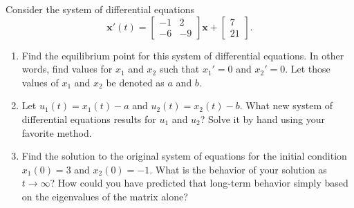 \documentclass[12pt,letterpaper]{hmcpset}
\newcommand{\m}[1]{\begin{bmatrix} #1 \end{bmatrix}}
\begin{document}
\begin{problem}[4]
    Consider the system of differential equations
    \[
        \mathbf{x}'(t)=\m{-1&2\\-6&-9}\mathbf{x}+\m{7\\21}.
    \]
    \begin{enumerate}
        \item Find the equilibrium point for this system of
            differential equations.  In other words, find values for
            $x_1$ and $x_2$ such that $x_1'=0$ and $x_2'=0$.  Let those
            values of $x_1$ and $x_2$ be denoted as $a$ and $b$.
        \item Let $u_1(t)=x_1(t)-a$ and $u_2(t)=x_2(t)-b$.  What new
            system of differential equations results for $u_1$ and
            $u_2$?  Solve it by hand using your favorite method.
        \item Find the solution to the original system of equations
            for the initial condition $x_1(0)=3$ and $x_2(0)=-1$. What
            is the behavior of your solution as $t\to\infty$?  How could
            you have predicted that long-term behavior simply based on
            the eigenvalues of the matrix alone?
    \end{enumerate}
\end{problem}
\begin{solution}
    \vfill
\end{solution}
\newpage
\end{document}
